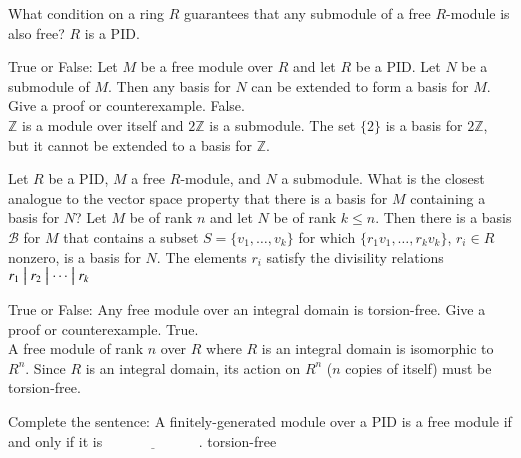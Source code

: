 \documentclass[avery5371,grid]{flashcards}
\newcommand{\Z}{\mathbb{Z}}
\newcommand{\divides}{\bigm|}
\newcommand{\blank}{$\; \underline{\hspace{1in}} \; $}
\begin{document}
\begin{flashcard}[Modules]{What condition on a ring $R$ guarantees that any submodule of a free $R$-module is also free?}
 $R$ is a PID.
\end{flashcard}

\begin{flashcard}[Modules]{True or False: Let $M$ be a free module over $R$ and let $R$ be a PID. Let $N$ be a submodule of $M$. Then any basis for $N$ can be extended to form a basis for $M$. Give a proof or counterexample.}
 False. \\
 
 $\Z$ is a module over itself and $2\Z$ is a submodule. The set $\{2\}$ is a basis for $2\Z$, but it cannot be extended to a basis for $\Z$.
\end{flashcard}

\begin{flashcard}[Modules]{Let $R$ be a PID, $M$ a free $R$-module, and $N$ a submodule. What is the closest analogue to the vector space property that there is a basis for $M$ containing a basis for $N$?}
 Let $M$ be of rank $n$ and let $N$ be of rank $k \leq n$. Then there is a basis $\mathcal{B}$ for $M$ that contains a subset $S = \{v_1, \ldots, v_k\}$ for which $\{r_1v_1, \ldots, r_kv_k \}$, $r_i \in R$ nonzero, is a basis for $N$. The elements $r_i$ satisfy the divisility relations $r_1 \divides r_2 \divides \cdots \divides r_k$
\end{flashcard}

\begin{flashcard}[Modules]{True or False: Any free module over an integral domain is torsion-free. Give a proof or counterexample.}
 True. \\
 
 A free module of rank $n$ over $R$ where $R$ is an integral domain is isomorphic to $R^n$. Since $R$ is an integral domain, its action on $R^n$ ($n$ copies of itself) must be torsion-free.
\end{flashcard}

\begin{flashcard}[Modules]{Complete the sentence: A finitely-generated module over a PID is a free module if and only if it is \blank.}
 torsion-free
\end{flashcard}
\end{document}
